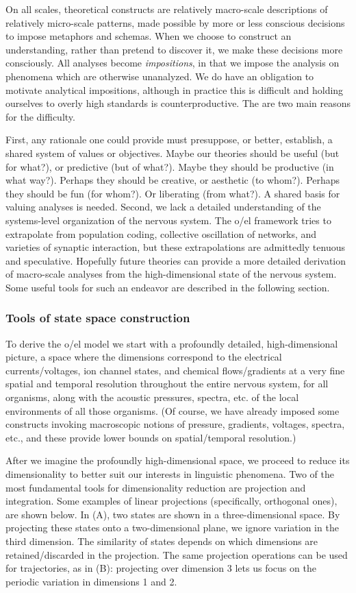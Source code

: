   On all scales, theoretical constructs are relatively macro-scale descriptions of relatively micro-scale patterns, made possible by more or less conscious decisions to impose metaphors and schemas. When we choose to construct an understanding, rather than pretend to discover it, we make these decisions more consciously. All analyses become \textit{impositions}, in that we impose the analysis on phenomena which are otherwise unanalyzed. We do have an obligation to motivate analytical impositions, although in practice this is difficult and holding ourselves to overly high standards is counterproductive. The are two main reasons for the difficulty. 

  First, any rationale one could provide must presuppose, or better, establish, a shared system of values or objectives. Maybe our theories should be useful (but for what?), or predictive (but of what?). Maybe they should be productive (in what way?). Perhaps they should be creative, or aesthetic (to whom?). Perhaps they should be fun (for whom?). Or liberating (from what?). A shared basis for valuing analyses is needed. Second, we lack a detailed understanding of the systems-level organization of the nervous system. The o/el framework tries to extrapolate from population coding, collective oscillation of networks, and varieties of synaptic interaction, but these extrapolations are admittedly tenuous and speculative. Hopefully future theories can provide a more detailed derivation of macro-scale analyses from the high-dimensional state of the nervous system. Some useful tools for such an endeavor are described in the following section.

\subsubsection{Tools of state space construction}

To derive the o/el model we start with a profoundly detailed, high-dimensional picture, a space where the dimensions correspond to the electrical currents/voltages, ion channel states, and chemical flows/gradients at a very fine spatial and temporal resolution throughout the entire nervous system, for all organisms, along with the acoustic pressures, spectra, etc. of the local environments of all those organisms. (Of course, we have already imposed some constructs invoking macroscopic notions of pressure, gradients, voltages, spectra, etc., and these provide lower bounds on spatial/temporal resolution.) 

  After we imagine the profoundly high-dimensional space, we proceed to reduce its dimensionality to better suit our interests in linguistic phenomena. Two of the most fundamental tools for dimensionality reduction are projection and integration. Some examples of linear projections (specifically, orthogonal ones), are shown below. In (A), two states are shown in a three-dimensional space. By projecting these states onto a two-dimensional plane, we ignore variation in the third dimension. The similarity of states depends on which dimensions are retained/discarded in the projection. The same projection operations can be used for trajectories, as in (B): projecting over dimension 3 lets us focus on the periodic variation in dimensions 1 and 2.

